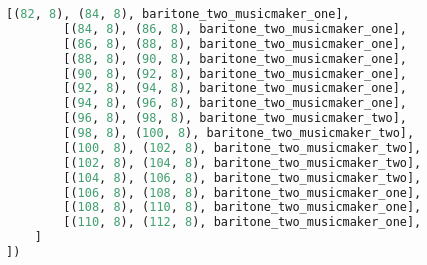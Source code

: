 \begin{lstlisting}[language=Python, caption=Invocation Source Code]
        [(82, 8), (84, 8), baritone_two_musicmaker_one],
        [(84, 8), (86, 8), baritone_two_musicmaker_one],
        [(86, 8), (88, 8), baritone_two_musicmaker_one],
        [(88, 8), (90, 8), baritone_two_musicmaker_one],
        [(90, 8), (92, 8), baritone_two_musicmaker_one],
        [(92, 8), (94, 8), baritone_two_musicmaker_one],
        [(94, 8), (96, 8), baritone_two_musicmaker_one],
        [(96, 8), (98, 8), baritone_two_musicmaker_two],
        [(98, 8), (100, 8), baritone_two_musicmaker_two],
        [(100, 8), (102, 8), baritone_two_musicmaker_two],
        [(102, 8), (104, 8), baritone_two_musicmaker_two],
        [(104, 8), (106, 8), baritone_two_musicmaker_two],
        [(106, 8), (108, 8), baritone_two_musicmaker_one],
        [(108, 8), (110, 8), baritone_two_musicmaker_one],
        [(110, 8), (112, 8), baritone_two_musicmaker_one],
    ]
])


\end{lstlisting}
